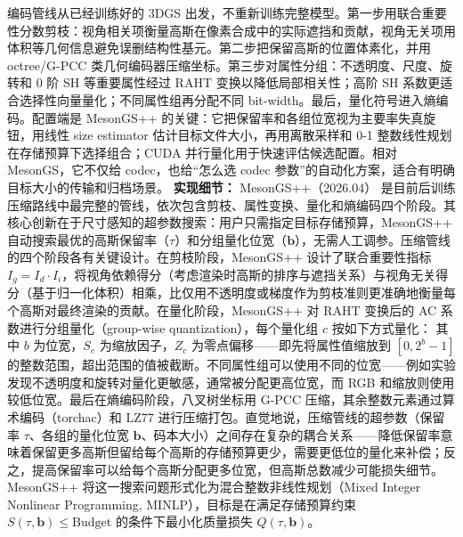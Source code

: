 编码管线从已经训练好的 3DGS 出发，不重新训练完整模型。第一步用联合重要性分数剪枝：视角相关项衡量高斯在像素合成中的实际遮挡和贡献，视角无关项用体积等几何信息避免误删结构性基元。第二步把保留高斯的位置体素化，并用 octree/G-PCC 类几何编码器压缩坐标。第三步对属性分组：不透明度、尺度、旋转和 0 阶 SH 等重要属性经过 RAHT 变换以降低局部相关性；高阶 SH 系数更适合选择性向量量化；不同属性组再分配不同 bit-width。最后，量化符号进入熵编码。配置端是 MesonGS++ 的关键：它把保留率和各组位宽视为主要率失真旋钮，用线性 size estimator 估计目标文件大小，再用离散采样和 0-1 整数线性规划在存储预算下选择组合；CUDA 并行量化用于快速评估候选配置。相对 MesonGS，它不仅给 codec，也给“怎么选 codec 参数”的自动化方案，适合有明确目标大小的传输和归档场景。
\textbf{实现细节：} MesonGS++（2026.04） 是目前后训练压缩路线中最完整的管线，依次包含剪枝、属性变换、量化和熵编码四个阶段。其核心创新在于尺寸感知的超参数搜索：用户只需指定目标存储预算，MesonGS++ 自动搜索最优的高斯保留率（$\tau$）和分组量化位宽（$\mathbf{b}$），无需人工调参。压缩管线的四个阶段各有关键设计。在剪枝阶段，MesonGS++ 设计了联合重要性指标 $I_g = I_d \cdot I_i$，将视角依赖得分（考虑渲染时高斯的排序与遮挡关系）与视角无关得分（基于归一化体积）相乘，比仅用不透明度或梯度作为剪枝准则更准确地衡量每个高斯对最终渲染的贡献。在量化阶段，MesonGS++ 对 RAHT 变换后的 AC 系数进行分组量化（group-wise quantization），每个量化组 $c$ 按如下方式量化： 其中 $b$ 为位宽，$S_c$ 为缩放因子，$Z_c$ 为零点偏移——即先将属性值缩放到 $[0, 2^b{-}1]$ 的整数范围，超出范围的值被截断。不同属性组可以使用不同的位宽——例如实验发现不透明度和旋转对量化更敏感，通常被分配更高位宽，而 RGB 和缩放则使用较低位宽。最后在熵编码阶段，八叉树坐标用 G-PCC 压缩，其余整数元素通过算术编码（torchac）和 LZ77 进行压缩打包。直觉地说，压缩管线的超参数（保留率 $\tau$、各组的量化位宽 $\mathbf{b}$、码本大小）之间存在复杂的耦合关系——降低保留率意味着保留更多高斯但留给每个高斯的存储预算更少，需要更低位的量化来补偿；反之，提高保留率可以给每个高斯分配更多位宽，但高斯总数减少可能损失细节。MesonGS++ 将这一搜索问题形式化为混合整数非线性规划（Mixed Integer Nonlinear Programming, MINLP），目标是在满足存储预算约束 $S(\tau, \mathbf{b}) \leq \mathrm{Budget}$ 的条件下最小化质量损失 $Q(\tau, \mathbf{b})$。
